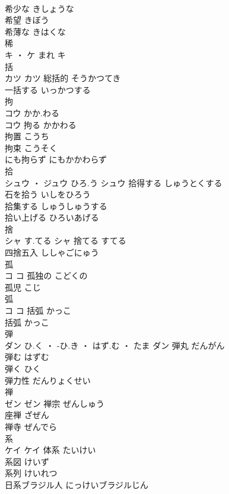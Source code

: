 \documentclass[8pt]{extreport}
\begin{document}
\begin{CJK}{UTF8}{min}
\\	希少な	きしょうな	
\\	希望	きぼう	
\\	希薄な	きはくな	
\\	稀	
\\	キ ・ ケ	まれ	キ																																			
\\	括	
\\	カツ		カツ	総括的	そうかつてき	
\\	一括する	いっかつする	
\\	拘	
\\	コウ	かか.わる
\\	コウ	拘る	かかわる	
\\	拘置	こうち	
\\	拘束	こうそく	
\\	にも拘らず	にもかかわらず	
\\	拾	
\\	シュウ ・ ジュウ	ひろ.う	シュウ	拾得する	しゅうとくする	
\\	石を拾う	いしをひろう	
\\	拾集する	しゅうしゅうする	
\\	拾い上げる	ひろいあげる	
\\	捨	
\\	シャ	す.てる	シャ	捨てる	すてる	
\\	四捨五入	ししゃごにゅう	
\\	孤	
\\	コ		コ	孤独の	こどくの	
\\	孤児	こじ	
\\	弧	
\\	コ		コ	括弧	かっこ	
\\	括弧	かっこ	
\\	弾	
\\	ダン	ひ.く ・ -ひ.き ・ はず.む ・ たま	ダン	弾丸	だんがん	
\\	弾む	はずむ	
\\	弾く	ひく	
\\	弾力性	だんりょくせい	
\\	禅	
\\	ゼン		ゼン	禅宗	ぜんしゅう	
\\	座禅	ざぜん	
\\	禅寺	ぜんでら	
\\	系	
\\	ケイ		ケイ	体系	たいけい	
\\	系図	けいず	
\\	系列	けいれつ	
\\	日系ブラジル人	にっけいブラジルじん	

\end{CJK}
\end{document}
